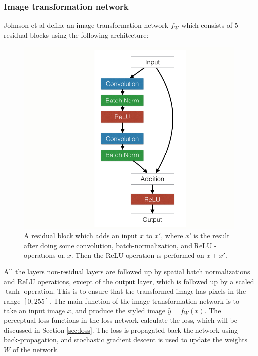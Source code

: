 \subsubsection{Image transformation network}
\label{sec:neuralnetwork}
Johnson et al define an image transformation network $f_W$ which consists of $5$ residual blocks using the following architecture:\newline\newline
\begin{figure}[!ht]
\begin{center}
\includegraphics[scale=0.30]{report/Background/images/residualblock.png}
\caption{A residual block which adds an input $x$ to $x'$, where $x'$ is the result after doing some convolution, batch-normalization, and ReLU - operations on $x$. Then the ReLU-operation is performed on $x+x'.$}
\label{fig:residual}
\end{center}
\end{figure}\newline
All the layers non-residual layers are followed up by spatial batch normalizations and ReLU operations, except of the output layer, which is followed up by a scaled $\tanh$ operation. This is to ensure that the transformed image has pixels in the range $[0, 255].$\newline\newline
The main function of the image transformation network is to take an input image $x$, and produce the styled image $\hat{y}=f_W(x).$ The perceptual loss functions in the loss network calculate the loss, which will be discussed in Section \ref{sec:loss}. The loss is propagated back the network using back-propagation, and stochastic gradient descent is used to update the weights $W$ of the network.
